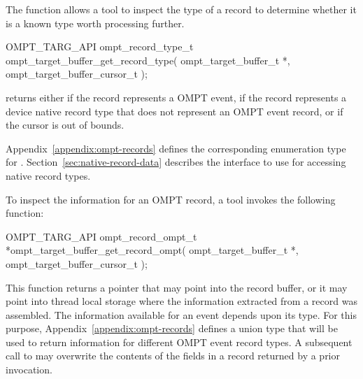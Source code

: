 \documentclass{article}
\begin{document}
The function  allows a tool to inspect the type of a record to determine whether it is a known type  worth processing further. 
\begin{boxedcode}
OMPT\_TARG\_API ompt\_record\_type\_t ompt\_target\_buffer\_get\_record\_type(
  ompt\_target\_buffer\_t *, 
  ompt\_target\_buffer\_cursor\_t 
);
\end{boxedcode}
\sloppy
{} returns either  if the record represents a OMPT event,  
 if the record represents a device native record type that does not represent an OMPT event record, or  if the cursor is out of bounds. 

Appendix~\ref{appendix:ompt-records} defines the corresponding enumeration type for . 
Section~\ref{sec:native-record-data} describes the interface to use for accessing native record types.
 

To inspect the information for an OMPT record, a tool invokes the following function:
\begin{boxedcode}
OMPT\_TARG\_API ompt\_record\_ompt\_t *ompt\_target\_buffer\_get\_record\_ompt(
  ompt\_target\_buffer\_t *, 
  ompt\_target\_buffer\_cursor\_t 
);
\end{boxedcode}
This function returns a pointer that may point into the record buffer, or it may point into thread local storage where the information extracted from a record was assembled. The information available for an event depends upon its type. For this purpose, Appendix~\ref{appendix:ompt-records} defines a union type that will be used to return information for different OMPT event record types. A subsequent call to  may overwrite the contents of the fields in a record returned by a prior invocation.

\end{document}
